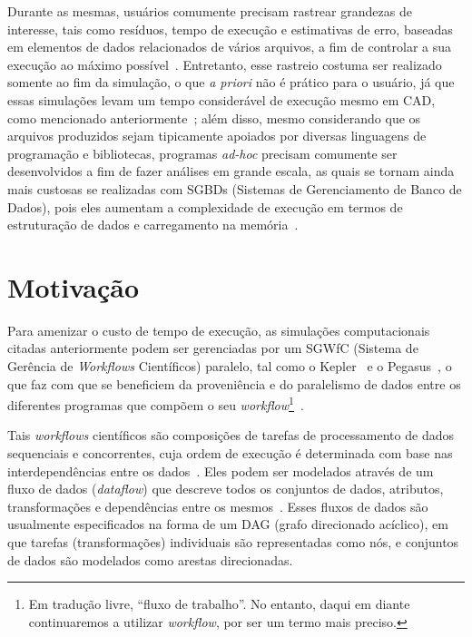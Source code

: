 Durante as mesmas, usuários comumente precisam rastrear grandezas de interesse, tais como resíduos, tempo de execução e estimativas de erro, baseadas em elementos de dados relacionados de vários arquivos, a fim de controlar a sua execução ao máximo possível~\cite{silva2016situ}.
Entretanto, esse rastreio costuma ser realizado somente ao fim da simulação, o que \textit{a priori} não é prático para o usuário, já que essas simulações levam um tempo considerável de execução mesmo em CAD, como mencionado anteriormente~\cite{silva2017raw}; além disso, mesmo considerando que os arquivos produzidos sejam tipicamente apoiados por diversas linguagens de programação e bibliotecas, programas \textit{ad-hoc} precisam comumente ser desenvolvidos a fim de fazer análises em grande escala, as quais se tornam ainda mais custosas se realizadas com  SGBDs (Sistemas de Gerenciamento de Banco de Dados), pois eles aumentam a complexidade de execução em termos de estruturação de dados e carregamento na memória~\cite{silva2015analyzing}.

\section{Motivação}

Para amenizar o custo de tempo de execução, as simulações computacionais citadas anteriormente podem ser gerenciadas por um  SGWfC (Sistema de Gerência de \textit{Workflows} Científicos) paralelo, tal como o Kepler~\cite{ludascher2006scientific} e o Pegasus~\cite{deelman2005pegasus}, o que faz com que se beneficiem da proveniência e do paralelismo de dados entre os diferentes programas que compõem o seu \textit{workflow}\footnote{Em tradução livre, ``fluxo de trabalho''. No entanto, daqui em diante continuaremos a utilizar \textit{workflow}, por ser um termo mais preciso.}~\cite{bux2013parallelization}.

Tais \textit{workflows} científicos são composições de tarefas de processamento de dados sequenciais e concorrentes, cuja ordem de execução é determinada com base nas interdependências entre os dados~\cite{bux2013parallelization}. Eles podem ser modelados através de um fluxo de dados (\textit{dataflow}) que descreve todos os conjuntos de dados, atributos, transformações e dependências entre os mesmos~\cite{silva2017raw}. Esses fluxos de dados são usualmente especificados na forma de um  DAG (grafo direcionado acíclico), em que tarefas (transformações) individuais são representadas como nós, e conjuntos de dados são modelados como arestas direcionadas.

